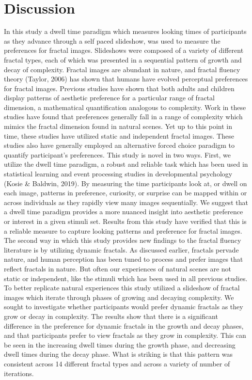 \documentclass[english,jou]{apa6}
\begin{document}
\hypertarget{discussion}{%
\section{Discussion}\label{discussion}}

In this study a dwell time paradigm which measures looking times of participants as they advance through a self paced slideshow, was used to measure the preferences for fractal images. Slideshows were composed of a variety of different fractal types, each of which was presented in a sequential pattern of growth and decay of complexity. Fractal images are abundant in nature, and fractal fluency theory (Taylor, 2006) has shown that humans have evolved perceptual preferences for fractal images. Previous studies have shown that both adults and children display patterns of aesthetic preference for a particular range of fractal dimension, a mathematical quantification analogous to complexity. Work in these studies have found that preferences generally fall in a range of complexity which mimics the fractal dimension found in natural scenes. Yet up to this point in time, these studies have utilized static and independent fractal images. These studies also have generally employed an alternative forced choice paradigm to quantify participant's preferences. This study is novel in two ways. First, we utilize the dwell time paradigm, a robust and reliable task which has been used in statistical learning and event processing studies in developmental psychology (Kosie \& Baldwin, 2019). By measuring the time participants look at, or dwell on each image, patterns in preference, curiosity, or surprise can be mapped within or across individuals as they rapidly view many images sequentially. We suggest that a dwell time paradigm provides a more nuanced insight into aesthetic preference or interest in a given stimuli set. Results from this study have verified that this is a reliable measure to capture looking patterns and preference for fractal images. The second way in which this study provides new findings to the fractal fluency literature is by utilizing dynamic fractals. As discussed earlier, fractals pervade nature, and human perception has been tuned to process and prefer images that reflect fractals in nature. But often our experiences of natural scenes are not static or independent, like the stimuli which has been used in all previous studies. To better replicate natural experiences this study utilized a slideshow of fractal images which iterate through phases of growing and decaying complexity. We sought to investigate whether participants would prefer dynamic fractals as they grow or decay in complexity. The results show that there is a significant difference in the preference for dynamic fractals in the growth and decay phases, and that participants prefer to view fractals as they grow in complexity. This can be seen in the increasing dwell times during the growth phase, and decreasing dwell times during the decay phase. What is striking is that this pattern was consistent across 14 different fractal types and across a variety of number of iterations.
\end{document}
